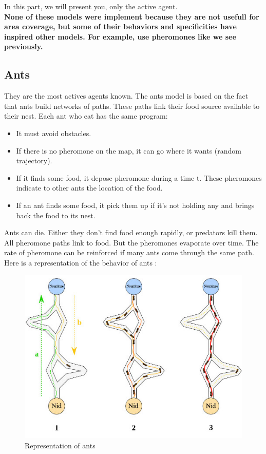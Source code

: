 \noindent In this part, we will present you, only the active agent.\\\textbf{None of these models were implement because they are not usefull for area coverage, but some of their behaviors and specificities have inspired other models. For example, use pheromones like we see previously.}

\subsection{Ants}

They are the most actives agents known. The ants model is based on the fact that ants build networks of paths. These paths link their food source available to their nest.
Each ant who eat has the same program:

\begin{itemize}
\item It must avoid obstacles.
\item If there is no pheromone on the map, it can go where it wants (random trajectory).
\item If it finds some food, it depose pheromone during a time t. These pheromones indicate to other ants the location of the food.
\item If an ant finds some food, it pick them up if it's not holding any and brings back the food to its nest.
\end{itemize}

Ants can die. Either they don't find food enough rapidly, or predators kill them.\\
All pheromone paths link to food. But the pheromones evaporate over time. The rate of pheromone can be reinforced if many ants come through the same path.\\
Here is a representation of the behavior of ants :

\begin{figure}[h]
\center
\includegraphics{../images/SchemaFourmi.png}
\caption{\label{AntsRepresentation} Representation of ants\cite{RepresentationOfAnts}}
\end{figure}

